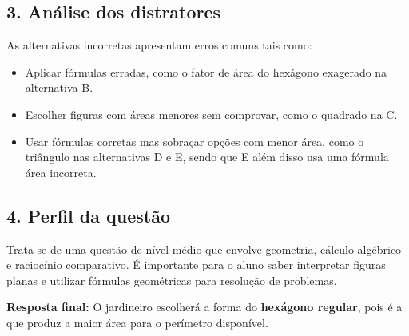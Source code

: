 \documentclass{article}
\begin{document}
\subsection*{3. Análise dos distratores}

As alternativas incorretas apresentam erros comuns tais como:
\begin{itemize}
  \item Aplicar fórmulas erradas, como o fator de área do hexágono exagerado na alternativa B.
  \item Escolher figuras com áreas menores sem comprovar, como o quadrado na C.
  \item Usar fórmulas corretas mas sobraçar opções com menor área, como o triângulo nas alternativas D e E, sendo que E além disso usa uma fórmula área incorreta.
\end{itemize}

\subsection*{4. Perfil da questão}

Trata-se de uma questão de nível médio que envolve geometria, cálculo algébrico e raciocínio comparativo. É importante para o aluno saber interpretar figuras planas e utilizar fórmulas geométricas para resolução de problemas.

\vspace{1em}

\noindent \textbf{Resposta final:} O jardineiro escolherá a forma do \textbf{hexágono regular}, pois é a que produz a maior área para o perímetro disponível.
\end{document}
